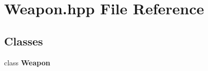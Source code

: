 \section{Weapon.\-hpp File Reference}
\label{_weapon_8hpp}
\subsection*{Classes}
\begin{DoxyCompactItemize}
\item 
class {\bf Weapon}
\end{DoxyCompactItemize}
